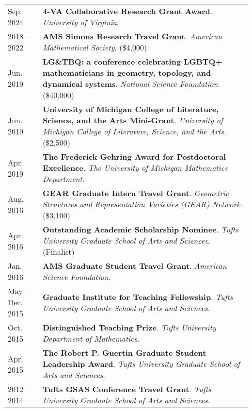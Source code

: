 
    \medskip


    \medskip
    
    \begin{center}
    {
    \renewcommand{\arraystretch}{1.5}
    \begin{longtable}{p{}  p{}}
     Sep.  2024 & \textbf{4-VA Collaborative Research Grant Award}. \textit{University of Virginia}.  \\ 
   2018 --    2022 & \textbf{AMS Simons Research Travel Grant}. \textit{American Mathematical Society}. (\$4,000) \\ 
 Jun.  2019 & \textbf{LG\&TBQ: a conference celebrating LGBTQ+ mathematicians in geometry, topology, and dynamical systems}. \textit{National Science Foundation}. (\$40,000) \\ 
 Jun.  2019 & \textbf{University of Michigan College of Literature, Science, and the Arts Mini-Grant}. \textit{University of Michigan College of Literature, Science, and the Arts}. (\$2,500) \\ 
 Apr.  2019 & \textbf{The Frederick Gehring Award for Postdoctoral Excellence}. \textit{The University of Michigan Mathematics Department}.  \\ 
 Aug.  2016 & \textbf{GEAR Graduate Intern Travel Grant}. \textit{Geometric Structures and Representation Varieties (GEAR) Network}. (\$3,100) \\ 
 Apr.  2016 & \textbf{Outstanding Academic Scholarship Nominee}. \textit{Tufts University Graduate School of Arts and Sciences}. (Finalist) \\ 
 Jan.  2016 & \textbf{AMS Graduate Student Travel Grant}. \textit{American Science Foundation}.  \\ 
 May  --  Dec.  2015 & \textbf{Graduate Institute for Teaching Fellowship}. \textit{Tufts University Graduate School of Arts and Sciences}.  \\ 
 Oct.  2015 & \textbf{Distinguished Teaching Prize}. \textit{Tufts University Department of Mathematics}.  \\ 
 Apr.  2015 & \textbf{The Robert P. Guertin Graduate Student Leadership Award}. \textit{Tufts University Graduate School of Arts and Sciences}.  \\ 
   2012 --    2014 & \textbf{Tufts GSAS Conference Travel Grant}. \textit{Tufts University Graduate School of Arts and Sciences}.  
    \end{longtable}
    } 
    \end{center}

    \vspace{-1em}
    